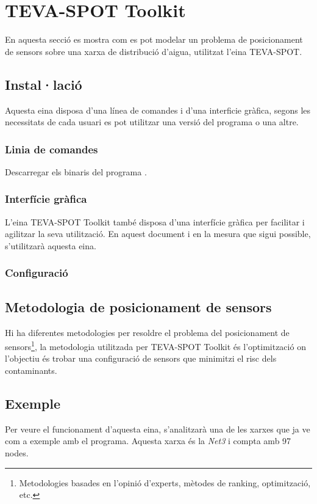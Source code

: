 \documentclass[12pt]{article}
\begin{document}
\clearpage
\section{TEVA-SPOT Toolkit}
En aquesta secció es mostra com es pot modelar un problema de posicionament de sensors sobre una xarxa de distribució d'aigua, utilitzat l'eina TEVA-SPOT.

\subsection{Instal·lació}
Aquesta eina disposa d'una línea de comandes i d'una interficie gràfica, segons les necessitats de cada usuari es pot utilitzar una versió del programa o una altre.
\subsubsection{Linia de comandes}
Descarregar els binaris del programa \cite{tevaSpotExec}.

\subsubsection{Interfície gràfica}
L'eina TEVA-SPOT Toolkit també disposa d'una interfície gràfica\cite{tevaSpotGui} per facilitar i agilitzar la seva utilització. En aquest document i en la mesura que sigui possible, s'utilitzarà aquesta eina.

\subsubsection{Configuració}

\subsection{Metodologia de posicionament de sensors}
Hi ha diferentes metodologies per resoldre el problema del posicionament de sensors\footnote{Metodologies basades en l'opinió d'experts, mètodes de ranking, optimització, etc.}, la metodologia utilitzada per TEVA-SPOT Toolkit és l'optimització on l'objectiu és trobar una configuració de sensors que minimitzi el risc dels contaminants.

\subsection{Exemple}
Per veure el funcionament d'aquesta eina, s'analitzarà una de les xarxes que ja ve com a exemple amb el programa. Aquesta xarxa és la \textit{Net3} i compta amb 97 nodes.
\end{document}
